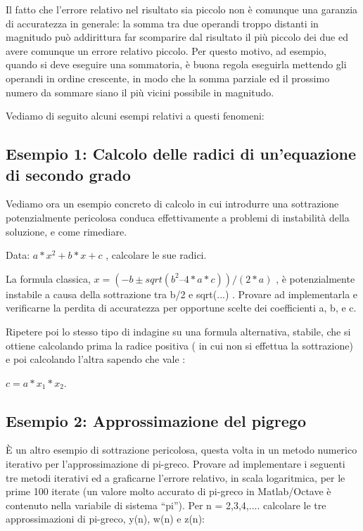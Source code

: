 Il fatto che l’errore relativo nel risultato sia piccolo non è comunque una garanzia di accuratezza  in generale: la somma tra due operandi troppo distanti in magnitudo può addirittura far scomparire dal risultato il più piccolo dei due ed avere comunque un errore relativo piccolo. Per questo motivo, ad esempio,  quando si deve eseguire una sommatoria, è buona regola eseguirla mettendo gli operandi in ordine crescente, in modo che la somma parziale ed il prossimo numero da sommare siano il più vicini possibile in magnitudo.

Vediamo di seguito alcuni esempi relativi a questi fenomeni:

\subsection{Esempio 1: Calcolo delle radici di un'equazione di secondo grado}

Vediamo ora un esempio concreto di calcolo in cui introdurre una sottrazione potenzialmente pericolosa conduca effettivamente a problemi di instabilità della soluzione, e come rimediare.

Data: $a*x^2 + b*x +c$ , calcolare le sue radici.

La formula classica, $x = (- b \pm sqrt(b^2 – 4*a*c))/(2*a)$ , è potenzialmente instabile a causa della sottrazione tra b/2 e sqrt(...) . Provare ad implementarla e verificarne la perdita di accuratezza per opportune scelte dei coefficienti a, b, e c.

Ripetere poi lo stesso tipo di indagine su una formula alternativa, stabile, che si ottiene calcolando prima la radice positiva ( in cui non si effettua la sottrazione) e poi calcolando l'altra sapendo che vale :  

\begin{center}
	$c = a * x_1 * x_2$.
\end{center}



\subsection{Esempio 2: Approssimazione del pigrego}

È un altro esempio di sottrazione pericolosa, questa volta in un metodo numerico iterativo per l’approssimazione di pi-greco. Provare ad implementare i seguenti tre metodi iterativi ed a graficarne l’errore relativo, in scala logaritmica, per le prime 100 iterate (un valore molto accurato di pi-greco in Matlab/Octave è contenuto nella variabile di sistema ``pi''). Per n = 2,3,4,.... calcolare le tre approssimazioni di pi-greco, y(n), w(n) e z(n):

